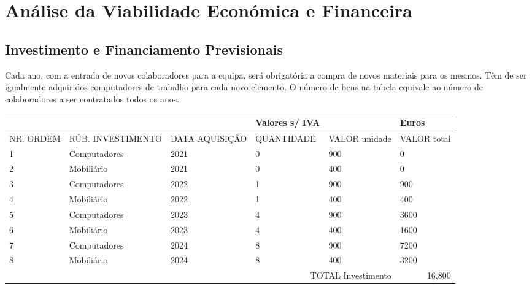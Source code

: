 \documentclass[11pt]{article}
\begin{document}
	\pagebreak
	
	\large
	\section{Análise da Viabilidade Económica e Financeira}
	\subsection{Investimento e Financiamento Previsionais}
	
	\normalsize
	
	Cada ano, com a entrada de novos colaboradores para a equipa, será obrigatória a compra de novos materiais para os mesmos. Têm de ser igualmente adquiridos computadores de trabalho para cada novo elemento. O número de bens na tabela equivale ao número de colaboradores a ser contratados todos os anos.
	
	\small
	\begin{adjustbox}{center}
		\begin{tabular}{|l|l|l|l|l|l|}
			\multicolumn{1}{l}{} & \multicolumn{1}{l}{} & \multicolumn{1}{l}{} & \multicolumn{1}{l}{Valores s/ IVA} & \multicolumn{1}{l}{} & \multicolumn{1}{l}{Euros} \\ \hline
			NR. ORDEM                 & RÚB. INVESTIMENTO & DATA AQUISIÇÃO & QUANTIDADE & VALOR unidade & VALOR total \\ \hline
			1                         &        Computadores      &    2021        &       0     &      900      &      0       \\ \hline
			2                         &        Mobiliário        &      2021      &     0       &   400         &     0        \\ \hline
			3                         &        Computadores      &    2022        &       1     &      900      &      900       \\ \hline
			4                         &        Mobiliário        &      2022      &     1       &   400         &     400        \\ \hline
			5                         &        Computadores      &    2023        &       4     &      900      &      3600       \\ \hline
			6                         &        Mobiliário        &      2023      &     4       &   400         &     1600        \\ \hline
			7                         &        Computadores      &    2024        &       8     &      900      &      7200       \\ \hline
			8                         &        Mobiliário        &      2024      &     8       &   400         &     3200        \\ \hline
			\multicolumn{5}{r}{TOTAL Investimento} & \multicolumn{1}{r}{16,800} \\ 
		\end{tabular}
	\end{adjustbox}
	\normalsize
	
\end{document}
